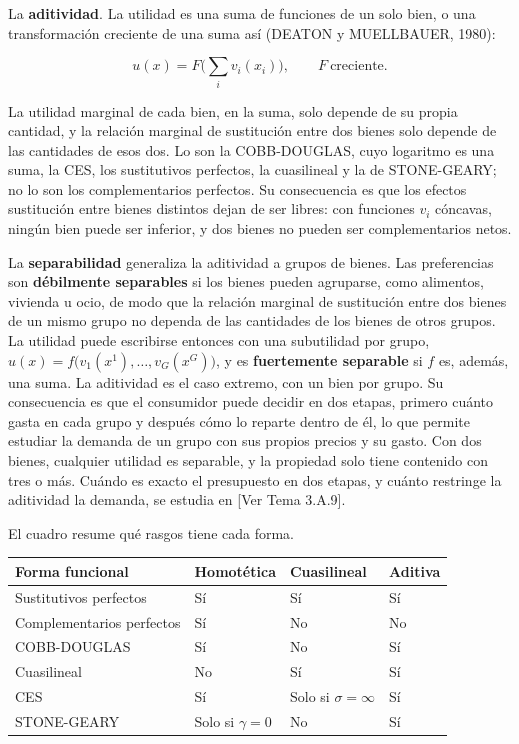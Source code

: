 \documentclass[10pt,a4paper]{article}
\newcommand{\authorfont}[1]{{\fontfamily{EBGaramond-TLF}\selectfont #1}}
\begin{document}
La \textbf{aditividad}. La utilidad es una suma de funciones de un solo bien, o una transformación creciente de una suma así (DEATON y MUELLBAUER, 1980):

$$u(x)=F\Big(\sum_iv_i(x_i)\Big),\qquad F\ \text{creciente}.$$

La utilidad marginal de cada bien, en la suma, solo depende de su propia cantidad, y la relación marginal de sustitución entre dos bienes solo depende de las cantidades de esos dos. Lo son la COBB-DOUGLAS, cuyo logaritmo es una suma, la CES, los sustitutivos perfectos, la cuasilineal y la de STONE-GEARY; no lo son los complementarios perfectos. Su consecuencia es que los efectos sustitución entre bienes distintos dejan de ser libres: con funciones $v_i$ cóncavas, ningún bien puede ser inferior, y dos bienes no pueden ser complementarios netos.

La \textbf{separabilidad} generaliza la aditividad a grupos de bienes. Las preferencias son \textbf{débilmente separables} si los bienes pueden agruparse, como alimentos, vivienda u ocio, de modo que la relación marginal de sustitución entre dos bienes de un mismo grupo no dependa de las cantidades de los bienes de otros grupos. La utilidad puede escribirse entonces con una subutilidad por grupo, $u(x)=f\big(v_1(x^1),\dots,v_G(x^G)\big)$, y es \textbf{fuertemente separable} si $f$ es, además, una suma. La aditividad es el caso extremo, con un bien por grupo. Su consecuencia es que el consumidor puede decidir en dos etapas, primero cuánto gasta en cada grupo y después cómo lo reparte dentro de él, lo que permite estudiar la demanda de un grupo con sus propios precios y su gasto. Con dos bienes, cualquier utilidad es separable, y la propiedad solo tiene contenido con tres o más. Cuándo es exacto el presupuesto en dos etapas, y cuánto restringe la aditividad la demanda, se estudia en [\authorfont{Ver Tema 3.A.9}].

El cuadro resume qué rasgos tiene cada forma.

\begin{center}
\small
\renewcommand{\arraystretch}{1.4}
\begin{tabular}{|p{4.2cm}|p{2.9cm}|p{2.9cm}|p{2.9cm}|}
    \hline
    \centering\textbf{Forma funcional} & \centering\textbf{Homotética} & \centering\textbf{Cuasilineal} & \centering\textbf{Aditiva}\tabularnewline
    \hline
    \raggedright Sustitutivos perfectos & \centering Sí & \centering Sí & \centering Sí\tabularnewline
    \hline
    \raggedright Complementarios perfectos & \centering Sí & \centering No & \centering No\tabularnewline
    \hline
    \raggedright COBB-DOUGLAS & \centering Sí & \centering No & \centering Sí\tabularnewline
    \hline
    \raggedright Cuasilineal & \centering No & \centering Sí & \centering Sí\tabularnewline
    \hline
    \raggedright CES & \centering Sí & \centering Solo si $\sigma=\infty$ & \centering Sí\tabularnewline
    \hline
    \raggedright STONE-GEARY & \centering Solo si $\gamma=0$ & \centering No & \centering Sí\tabularnewline
    \hline
\end{tabular}
\end{center}
\end{document}
